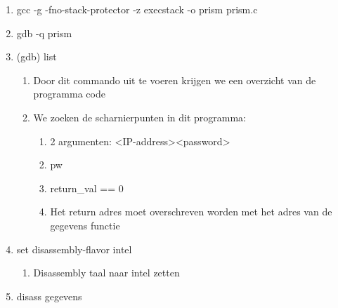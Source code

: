 \begin{enumerate}
  \item gcc -g -fno-stack-protector -z execstack -o prism prism.c
  \item gdb -q prism 
  \item (gdb) list
  	\begin{enumerate}
  	\item Door dit commando uit te voeren krijgen we een overzicht van de programma code
  	\item We zoeken de scharnierpunten in dit programma:
  		\begin{enumerate}
  		\item 2 argumenten: \textless IP-address\textgreater \textless password\textgreater
  		\item pw
  		\item return\_val == 0
 		\item Het return adres moet overschreven worden met het adres van de gegevens functie
  		\end{enumerate}
  	\end{enumerate}
  \item set disassembly-flavor intel
  	\begin{enumerate}
  	\item Disassembly taal naar intel zetten
  	\end{enumerate}
  \item disass gegevens
  
  
\end{enumerate}